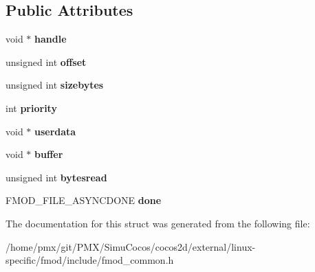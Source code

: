 \subsection*{Public Attributes}
\begin{DoxyCompactItemize}
\item 
\mbox{\label{structFMOD__ASYNCREADINFO_a3d4c5ed32198fbfc04301f3d23f25f36}} 
void $\ast$ {\bfseries handle}
\item 
\mbox{\label{structFMOD__ASYNCREADINFO_a8d42cc77cd8ef0559a666038e02a8807}} 
unsigned int {\bfseries offset}
\item 
\mbox{\label{structFMOD__ASYNCREADINFO_a19cda62a563d8b9c3116411c13d207f6}} 
unsigned int {\bfseries sizebytes}
\item 
\mbox{\label{structFMOD__ASYNCREADINFO_aae5a4b76307bec7a0132b3abb04ab823}} 
int {\bfseries priority}
\item 
\mbox{\label{structFMOD__ASYNCREADINFO_a5354f411977bfd939a4eff8484a3cf22}} 
void $\ast$ {\bfseries userdata}
\item 
\mbox{\label{structFMOD__ASYNCREADINFO_a5c34e1bc9be84ed5d8d3a6722cb30df6}} 
void $\ast$ {\bfseries buffer}
\item 
\mbox{\label{structFMOD__ASYNCREADINFO_acef1543320ee49d5c723ce1dbd58e43b}} 
unsigned int {\bfseries bytesread}
\item 
\mbox{\label{structFMOD__ASYNCREADINFO_a8d4dd7a3937c433d75fd182cea1a3158}} 
F\+M\+O\+D\+\_\+\+F\+I\+L\+E\+\_\+\+A\+S\+Y\+N\+C\+D\+O\+NE {\bfseries done}
\end{DoxyCompactItemize}


The documentation for this struct was generated from the following file\+:\begin{DoxyCompactItemize}
\item 
/home/pmx/git/\+P\+M\+X/\+Simu\+Cocos/cocos2d/external/linux-\/specific/fmod/include/fmod\+\_\+common.\+h\end{DoxyCompactItemize}

